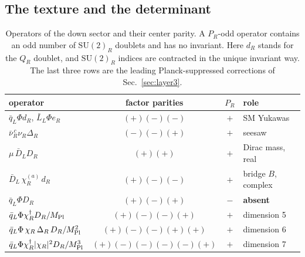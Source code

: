 \documentclass[submission, Phys]{SciPost}
\newcommand{\SU}{\mathrm{SU}}
\newcommand{\MPl}{M_{\rm Pl}}
\newcommand{\PR}{P_R}
\begin{document}
\subsection{The texture and the determinant}
\label{sec:layer2}

\begin{table}[t]
\centering
\caption{Operators of the down sector and their center parity. A
$\PR$-odd operator contains an odd number of $\SU(2)_R$ doublets and
has no invariant. Here $d_R$ stands for the $Q_R$ doublet, and
$\SU(2)_R$ indices are contracted in the unique invariant way. The last
three rows are the leading Planck-suppressed corrections of
Sec.~\ref{sec:layer3}.}
\label{tab:ledger}
\renewcommand{\arraystretch}{1.3}
\begin{tabular}{lccl}
\toprule
operator & factor parities & $\PR$ & role \\
\midrule
$\bar q_L\Phi d_R$, $\bar L_L\Phi e_R$ & $(+)(-)(-)$ & $+$ & SM Yukawas \\
$\bar\nu_R^{\,c}\nu_R\Delta_R$ & $(-)(-)(+)$ & $+$ & seesaw \\
$\mu\,\bar D_LD_R$ & $(+)(+)$ & $+$ & Dirac mass, real \\
$\bar D_L\,\chi^{(a)}_R\,d_R$ & $(+)(-)(-)$ & $+$ & bridge $B$, complex \\
$\bar q_L\Phi D_R$ & $(+)(-)(+)$ & $-$ & \textbf{absent} \\
\midrule
$\bar q_L\Phi\chi_R^{\dagger}D_R/\MPl$ & $(+)(-)(-)(+)$ & $+$ & dimension 5 \\
$\bar q_L\Phi\,\chi_R\,\Delta_R\,D_R/\MPl^{2}$ & $(+)(-)(-)(+)(+)$ & $+$ & dimension 6 \\
$\bar q_L\Phi\chi_R^{\dagger}|\chi_R|^{2}D_R/\MPl^{3}$ & $(+)(-)(-)(-)(-)(+)$ & $+$ & dimension 7 \\
\bottomrule
\end{tabular}
\end{table}
\end{document}
